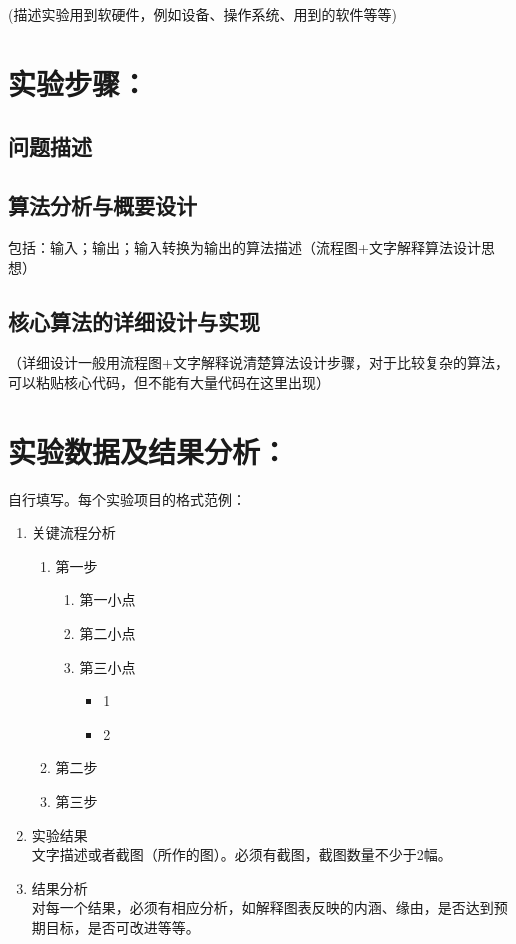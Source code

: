 \documentclass[a4paper,11pt,UTF8,AutoFakeBold]{ctexart}
\begin{document}
(描述实验用到软硬件，例如设备、操作系统、用到的软件等等)\\

\section{实验步骤：}

\subsection{问题描述}
\subsection{算法分析与概要设计}
包括：输入；输出；输入转换为输出的算法描述（流程图+文字解释算法设计思想）
\subsection{核心算法的详细设计与实现}
（详细设计一般用流程图+文字解释说清楚算法设计步骤，对于比较复杂的算法，可以粘贴核心代码，但不能有大量代码在这里出现）


\section{实验数据及结果分析：}

自行填写。每个实验项目的格式范例：
\begin{enumerate}
  \item 关键流程分析
  \begin{enumerate}
  	\item 第一步
  	\begin{enumerate}
  		\item 第一小点
  		\item 第二小点
  		\item 第三小点
  		\begin{itemize}
  			\item 1
  			\item 2
  		\end{itemize}
  	\end{enumerate}
  	\item 第二步
  	\item 第三步
  \end{enumerate}
  \item 实验结果 \\ 文字描述或者截图（所作的图）。必须有截图，截图数量不少于2幅。
  \item 结果分析 \\ 对每一个结果，必须有相应分析，如解释图表反映的内涵、缘由，是否达到预期目标，是否可改进等等。\\
\end{enumerate}
\end{document}
